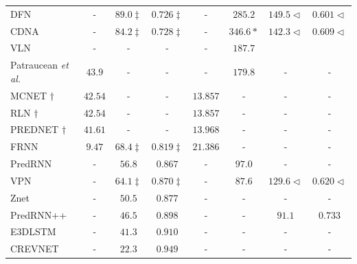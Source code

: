 \begin{table}[!t]
\begin{tabular} {@{}lccccccc@{}}
		\ac{DFN} \cite{Brabandere2016} & - & $89.0\ddag$ & $0.726\ddag$ & - & $285.2$ & $149.5\triangleleft$ & $0.601\triangleleft$\\
		\ac{CDNA} \cite{Finn2016} & - & $84.2\ddag$ & $0.728\ddag$ & - & $346.6\ast$ & $142.3\triangleleft$ & $0.609\triangleleft$\\
		\acs{VLN} \cite{Cricri2016} & - & - & - & - & $187.7$ \\
		Patraucean \textit{et al.} \cite{Patraucean2015} & $43.9$ & - & - & - & $179.8$ & - & -\\
		\ac{MCNET} \cite{Villegas2017a}$\dag$ & $42.54$ & - & - & $13.857$ & - & - & -\\
		\acs{RLN} \cite{Premont-Schwarz2017}$\dag$ & $42.54$ & - & - & $13.857$ & - & - & -\\
		\ac{PREDNET} \cite{Lotter2017}$\dag$ & $41.61$ & - & - & $13.968$ & - & - & - \\
		\acs{FRNN} \cite{Oliu2018} & $\mathbf{9.47}$ & $68.4\ddag$ & $0.819\ddag$ & $\mathbf{21.386}$ & - & - & -\\
		PredRNN \cite{Wang2017} & - & $56.8$ & $0.867$ & - & $97.0$ & - & -\\
		\acs{VPN} \cite{Kalchbrenner2016} & - & $64.1\ddag$ & $0.870\ddag$ & - & $\mathbf{87.6}$ & $129.6\triangleleft$ & $0.620\triangleleft$\\
		Znet \cite{Zhang2019} & - & $50.5$ & $0.877$ & - & - & - & -\\
		PredRNN++ \cite{Wang2018} & - & $46.5$ & $0.898$ & - & - & $\mathbf{91.1}$ & $\mathbf{0.733}$\\
		\ac{E3DLSTM} \cite{Wang2019b} & - & $41.3$ & $0.910$ & - & - & - & -\\
		\ac{CREVNET} \cite{Yu2020} & - & $\mathbf{22.3}$ & $\mathbf{0.949}$ & - & - & - & -\\
		\bottomrule
	\end{tabular}
\end{table}

